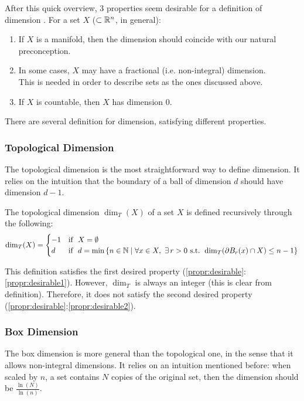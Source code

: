 After this quick overview, 3 properties seem desirable for a definition of dimension \cite{Pollicott_LFDT}.
For a set $X$ ($\subset \mathbb{R}^n$, in general):
\begin{enumerate}\label{propr:desirable}
	\item If $X$ is a manifold, then the dimension should coincide with our natural preconception. \label{propr:desirable1}
	\item In some cases, $X$ may have a fractional (i.e. non-integral) dimension. \label{propr:desirable2}\\
	This is needed in order to describe sets as the ones discussed above.
	\item If $X$ is countable, then $X$ has dimension $0$. \label{propr:desirable3}
\end{enumerate}
There are several definition for dimension, satisfying different properties.

\subsubsection{Topological Dimension}
The topological dimension is the most straightforward way to define dimension.
It relies on the intuition that the boundary of a ball of dimension $d$ should have dimension $d-1$.

\begin{definition}\label{def:topologicalDimension}
	The topological dimension $\dim_T(X)$ of a set $X$ is defined recursively through the following:
	\begin{equation*}
		\dim_T(X) =
		\begin{cases}
			-1 & \text{if } \ X = \emptyset \\
			 d & \text{if } \ d = \min \left\lbrace n \in \mathbb{N} \mid \forall x \in X, \ \exists \, r>0 \text{ s.t. } \dim_T(\partial B_r(x) \cap X) \leq n-1 \right\rbrace
		\end{cases}
	\end{equation*}
\end{definition}

This definition satisfies the first desired property (\ref{propr:desirable}:\ref{propr:desirable1}).
However, $\dim_T$ is always an integer (this is clear from definition).
Therefore, it does not satisfy the second desired property (\ref{propr:desirable}:\ref{propr:desirable2}).

\subsubsection{Box Dimension}
The box dimension is more general than the topological one, in the sense that it allows non-integral dimensions.
It relies on an intuition mentioned before: when scaled by $n$, a set contains $N$ copies of the original set, then the dimension should be  $\frac{\ln(N)}{\ln(n)}$.


